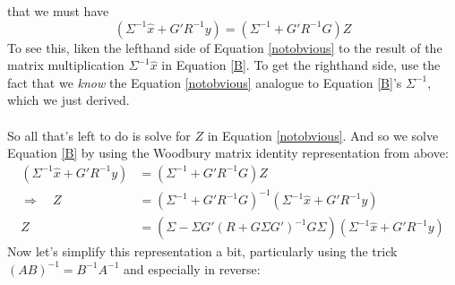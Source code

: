 \documentclass[a4paper,12pt]{scrartcl}
\begin{document}
that we must have 
\begin{equation}
    \label{notobvious}
    (\Sigma^{-1} \hat{x} + G'R^{-1}y) 
	= \left( \Sigma^{-1} + G'R^{-1}G\right) Z
\end{equation}
To see this, 
liken the lefthand side of Equation \ref{notobvious} to
the result of the matrix multiplication $\Sigma^{-1}\hat{x}$ in
Equation \ref{B}. To get the righthand side, use the fact
that we \emph{know} the Equation \ref{notobvious} analogue
to Equation \ref{B}'s $\Sigma^{-1}$, which we just derived.
\\
\\
So all that's left to do is solve for $Z$ in Equation
\ref{notobvious}.
And so we solve Equation \ref{B} by using the Woodbury matrix
identity representation from above:
\begin{align*}
    (\Sigma^{-1} \hat{x} + G'R^{-1}y) &= 
	\left( \Sigma^{-1} + G'R^{-1}G\right) Z \\
    \Rightarrow \quad Z &=
	\left( \Sigma^{-1} + G'R^{-1}G\right)^{-1} 
	(\Sigma^{-1} \hat{x} + G'R^{-1}y) \\
    Z &= 
	\left( \Sigma - \Sigma G'(R 
	+ G\Sigma G')^{-1}
	G\Sigma\right) \left(\Sigma^{-1} \hat{x} 
	+ G'R^{-1}y\right)
\end{align*}
Now let's simplify this representation a bit, particularly
using the trick $(AB)^{-1} = B^{-1}A^{-1}$ and
especially in reverse:
\end{document}
